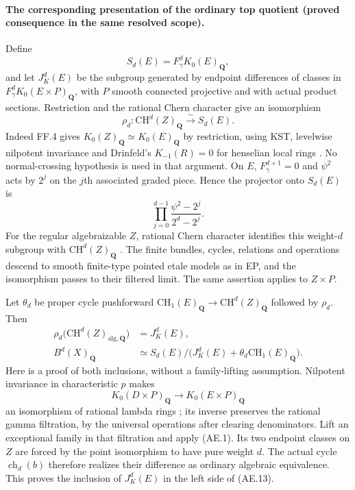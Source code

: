 \paragraph{The corresponding presentation of the ordinary top quotient
(proved consequence in the same resolved scope).}
Define
\[
 S_d(E)=F_\gamma^dK_0(E)_{\mathbf Q},
\]
and let $J_K^d(E)$ be the subgroup generated by endpoint differences
of classes in $F_\gamma^dK_0(E\times P)_{\mathbf Q}$, with $P$
smooth connected projective and with actual product sections.
Restriction and the rational Chern character give an isomorphism
\begin{equation}
         \rho_d:\mathrm{CH}^d(Z)_{\mathbf Q}
                         \xrightarrow{\sim}S_d(E).     \tag{AE.11}
\end{equation}
Indeed FF.4 gives $K_0(Z)_{\mathbf Q}\simeq K_0(E)_{\mathbf Q}$
by restriction, using KST, levelwise nilpotent invariance and
Drinfeld's $K_{-1}(R)=0$ for henselian local rings
\citep[Theorem 3.7 and Remark (ii), p.~8]{frDrinfeld2004Tate}.
No normal-crossing hypothesis is used in that argument.
On $E$, $F_\gamma^{d+1}=0$ and $\psi^2$ acts by $2^j$ on
the $j$th associated graded piece.  Hence the projector onto
$S_d(E)$ is
\begin{equation}
       \prod_{j=0}^{d-1}
                \frac{\psi^2-2^j}{2^d-2^j}.           \tag{AE.12}
\end{equation}
For the regular algebraizable $Z$, rational Chern character
identifies this weight-$d$ subgroup with $\mathrm{CH}^d(Z)_{\mathbf Q}$
\citep[Chapter II, Proposition 4.9 and Corollary 8.9.1]
{D_Weibel2013KbookII}.  The finite bundles, cycles, relations
and operations descend to smooth finite-type pointed etale
models as in EP, and the isomorphism passes to their filtered
limit.  The same assertion applies to $Z\times P$.

Let $\theta_d$ be proper cycle pushforward
$\mathrm{CH}_1(E)_{\mathbf Q}\to\mathrm{CH}^d(Z)_{\mathbf Q}$
followed by $\rho_d$.  Then
\begin{align}
 \rho_d\bigl(\mathrm{CH}^d(Z)_{\mathrm{alg},\mathbf Q}\bigr)
       &=J_K^d(E),                                     \tag{AE.13}\\
 B^d(X)_{\mathbf Q}
       &\simeq S_d(E)\big/
           \bigl(J_K^d(E)+\theta_d\mathrm{CH}_1(E)_{\mathbf Q}\bigr).
                                                        \tag{AE.14}
\end{align}
Here is a proof of both inclusions, without a family-lifting
assumption.  Nilpotent invariance in characteristic $p$ makes
\[
 K_0(D\times P)_{\mathbf Q}\longrightarrow K_0(E\times P)_{\mathbf Q}
\]
an isomorphism of rational lambda rings
\citep[Theorem A]{rootGeisserHesselholt2011}; its inverse preserves
the rational gamma filtration, by the universal operations after
clearing denominators.  Lift an exceptional family in that
filtration and apply (AE.1).  Its two endpoint classes on $Z$
are forced by the point isomorphism to have pure weight $d$.
The actual cycle $\operatorname{ch}_d(b)$ therefore realizes
their difference as ordinary algebraic equivalence.  This proves
the inclusion of $J_K^d(E)$ in the left side of (AE.13).

